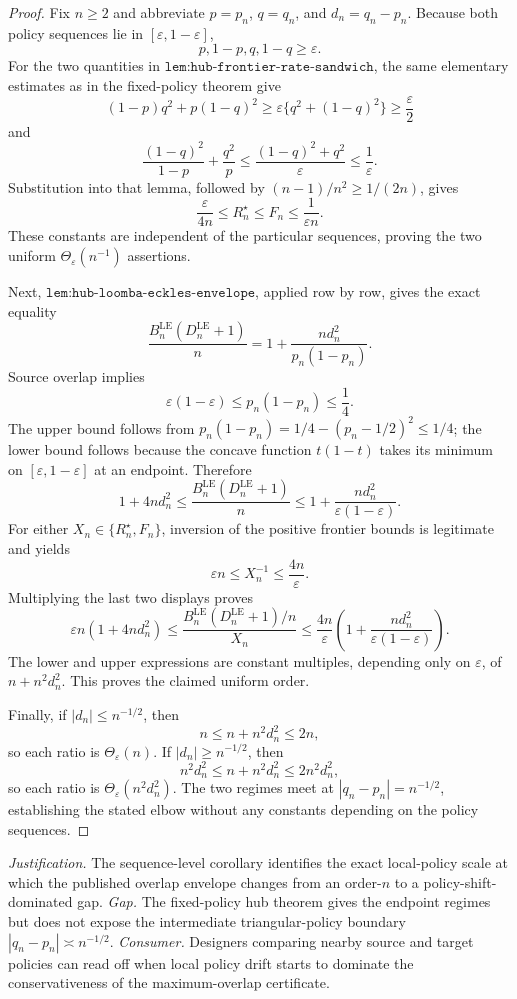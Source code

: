 \documentclass{article}
\begin{document}
\begin{proof}
Fix \(n\ge2\) and abbreviate \(p=p_n\), \(q=q_n\), and \(d_n=q_n-p_n\).  Because both policy sequences lie in \([\varepsilon,1-\varepsilon]\),
\[
 p,1-p,q,1-q\ge\varepsilon.
\]
For the two quantities in \(\texttt{lem:hub-frontier-rate-sandwich}\), the same elementary estimates as in the fixed-policy theorem give
\[
 (1-p)q^2+p(1-q)^2
 \ge\varepsilon\{q^2+(1-q)^2\}
 \ge\frac\varepsilon2
\]
and
\[
 \frac{(1-q)^2}{1-p}+\frac{q^2}{p}
 \le\frac{(1-q)^2+q^2}{\varepsilon}
 \le\frac1\varepsilon.
\]
Substitution into that lemma, followed by \((n-1)/n^2\ge1/(2n)\), gives
\[
 \frac{\varepsilon}{4n}
 \le R_n^{\star}\le F_n\le\frac1{\varepsilon n}.
\]
These constants are independent of the particular sequences, proving the two uniform \(\Theta_{\varepsilon}(n^{-1})\) assertions.

Next, \(\texttt{lem:hub-loomba-eckles-envelope}\), applied row by row, gives the exact equality
\[
 \frac{B_n^{\mathrm{LE}}(D_n^{\mathrm{LE}}+1)}n
 =1+\frac{n d_n^2}{p_n(1-p_n)}.
\]
Source overlap implies
\[
 \varepsilon(1-\varepsilon)
 \le p_n(1-p_n)\le\frac14.
\]
The upper bound follows from
\(p_n(1-p_n)=1/4-(p_n-1/2)^2\le1/4\); the lower bound follows because the concave function \(t(1-t)\) takes its minimum on \([\varepsilon,1-\varepsilon]\) at an endpoint.  Therefore
\[
 1+4n d_n^2
 \le
 \frac{B_n^{\mathrm{LE}}(D_n^{\mathrm{LE}}+1)}n
 \le
 1+\frac{n d_n^2}{\varepsilon(1-\varepsilon)}.
\]
For either \(X_n\in\{R_n^{\star},F_n\}\), inversion of the positive frontier bounds is legitimate and yields
\[
 \varepsilon n\le X_n^{-1}\le\frac{4n}{\varepsilon}.
\]
Multiplying the last two displays proves
\[
 \varepsilon n(1+4n d_n^2)
 \le
 \frac{B_n^{\mathrm{LE}}(D_n^{\mathrm{LE}}+1)/n}{X_n}
 \le
 \frac{4n}{\varepsilon}
 \left(1+\frac{n d_n^2}{\varepsilon(1-\varepsilon)}\right).
\]
The lower and upper expressions are constant multiples, depending only on \(\varepsilon\), of \(n+n^2d_n^2\).  This proves the claimed uniform order.

Finally, if \(|d_n|\le n^{-1/2}\), then
\[
 n\le n+n^2d_n^2\le2n,
\]
so each ratio is \(\Theta_{\varepsilon}(n)\).  If \(|d_n|\ge n^{-1/2}\), then
\[
 n^2d_n^2\le n+n^2d_n^2\le2n^2d_n^2,
\]
so each ratio is \(\Theta_{\varepsilon}(n^2d_n^2)\).  The two regimes meet at \(|q_n-p_n|=n^{-1/2}\), establishing the stated elbow without any constants depending on the policy sequences.
\end{proof}
\par\smallskip\noindent \textit{Justification.} The sequence-level corollary identifies the exact local-policy scale at which the published overlap envelope changes from an order-\(n\) to a policy-shift-dominated gap. \textit{Gap.} The fixed-policy hub theorem gives the endpoint regimes but does not expose the intermediate triangular-policy boundary \(|q_n-p_n|\asymp n^{-1/2}\). \textit{Consumer.} Designers comparing nearby source and target policies can read off when local policy drift starts to dominate the conservativeness of the maximum-overlap certificate.
\end{document}
